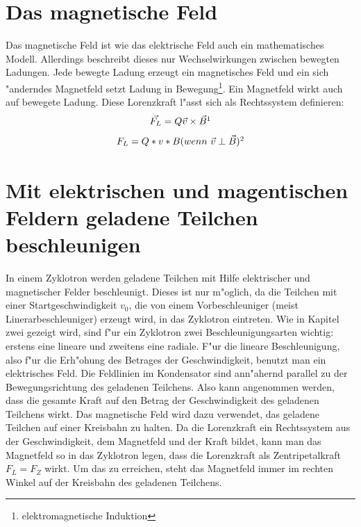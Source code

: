 \documentclass[14pt, a4paper]{report}
\begin{document}
\section{Das magnetische Feld}
Das magnetische Feld ist wie das elektrische Feld auch ein mathematisches Modell.
Allerdings beschreibt dieses nur Wechselwirkungen zwischen bewegten Ladungen. Jede
bewegte Ladung erzeugt ein magnetisches Feld und ein sich "anderndes Magnetfeld 
setzt Ladung in Bewegung\footnote{elektromagnetische Induktion}.
Ein Magnetfeld wirkt auch auf bewegete Ladung. Diese Lorenzkraft l"asst sich als
Rechtssystem definieren:
\newpage
\begin{equation} \label{B-Feld-Gleichungen}
 \vec{F_L} = Q\vec{v} \times \vec{B} \footnotemark
\end{equation}
\begin{equation}
 F_L  = Q * v * B (wenn ~ \vec{v} \perp \vec{B}) \footnotemark
\end{equation}

 
\section{Mit elektrischen und magentischen Feldern geladene Teilchen beschleunigen}
In einem Zyklotron werden geladene Teilchen mit Hilfe elektrischer und magnetischer 
Felder beschleunigt. Dieses ist nur m"oglich, da die Teilchen mit einer
Startgeschwindigkeit $v_0$, die von einem Vorbeschleuniger (meist 
Linerarbeschleuniger) erzeugt wird, in das Zyklotron eintreten. Wie in Kapitel zwei
gezeigt wird,
sind f"ur ein Zyklotron zwei Beschleunigungsarten wichtig: erstens eine lineare und 
zweitens eine radiale. F"ur die lineare Beschleunigung, also f"ur die Erh"ohung des 
Betrages der Geschwindigkeit, benutzt man ein elektrisches Feld. Die Feldlinien im 
Kondensator sind ann"ahernd parallel zu der Bewegungsrichtung des geladenen Teilchens. 
Also kann angenommen werden, dass die gesamte Kraft auf den Betrag der Geschwindigkeit 
des geladenen Teilchens wirkt. Das magnetische Feld wird dazu verwendet, das geladene
Teilchen auf einer Kreisbahn zu halten. Da die Lorenzkraft ein Rechtssystem aus der
Geschwindigkeit, dem Magnetfeld und der Kraft bildet, kann man das Magnetfeld so
in das Zyklotron legen, dass die Lorenzkraft als Zentripetalkraft $F_L = F_Z$ wirkt.
Um das zu erreichen, steht das Magnetfeld immer im rechten Winkel auf der Kreisbahn
des geladenen Teilchens.
\end{document}
